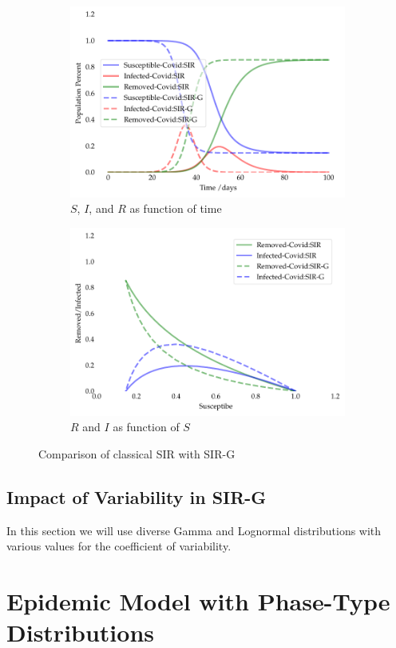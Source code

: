 \documentclass[twoside,USenglish,10pt]{article}
\begin{document}
\begin{figure}
	\centering
	\begin{subfigure}{.45\textwidth}
		\includegraphics[width=.8\linewidth]{CovidSIR-comp}
		\caption{$S$, $I$, and $R$ as function of time}
	\end{subfigure}	
	\begin{subfigure}{.45\textwidth}
		\includegraphics[width=.8\linewidth]{CovidIR-comp}
		\caption{$R$ and $I$ as function of $S$}
	\end{subfigure}	
	\caption{Comparison of classical SIR with SIR-G}
	\label{fig:comp}
\end{figure}


\subsection{Impact of Variability in SIR-G}

In this section we will use diverse Gamma and Lognormal distributions with various values for the coefficient of variability.



\section{Epidemic Model with Phase-Type Distributions}\label{sc:PH}
\end{document}
